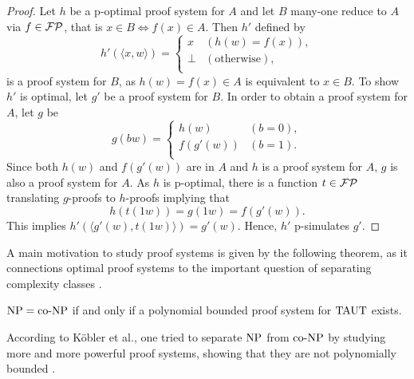   \begin{proof}
    Let \(h\) be a p-optimal proof system for \(A\) and let \(B\) many-one reduce to \(A\) via \(f \in \mathcal{FP}\), that is \(x \in B \Leftrightarrow f(x) \in A\). Then \(h'\) defined by
      \[ 
        h'(\langle x, w \rangle) =
        \begin{cases}
          x & (h(w) = f(x)), \\
          \perp & (\text{otherwise}), \\
        \end{cases}
      \]
    is a proof system for \(B\), as \(h(w) = f(x) \in A\) is equivalent to \(x \in B\). To show \(h'\) is optimal, let \(g'\) be a proof system for \(B\). In order to obtain a proof system for \(A\), let \(g\) be
      \[
        g(bw) =
        \begin{cases}
          h(w) & (b = 0), \\
          f(g'(w)) & (b = 1). \\
        \end{cases}
      \]
    Since both \(h(w)\) and \(f(g'(w))\) are in \(A\) and \(h\) is a proof system for \(A\), \(g\) is also a proof system for \(A\). As \(h\) is p-optimal, there is a function \(t \in \mathcal{FP}\) translating \(g\)-proofs to \(h\)-proofs implying that
    \[
      h(t(1w)) = g(1w) = f(g'(w)).
    \]
    This implies \(h'(\langle g'(w), t(1w) \rangle ) = g'(w)\). Hence, \(h'\) p-simulates \(g'\).
  \end{proof}

  A main motivation to study proof systems is given by the following theorem, as it connections optimal proof systems to the important question of separating complexity classes \cite{KMT03}.

  \begin{theorem}
   \(\text{NP} = \text{co-NP}\) if and only if a polynomial bounded proof system for \(\text{TAUT}\) exists.
  \end{theorem}

  According to Köbler et al., one tried to separate \(\text{NP}\) from \(\text{co-NP}\) by studying more and more powerful proof systems, showing that they are not polynomially bounded \cite{KMT03}. 





  
